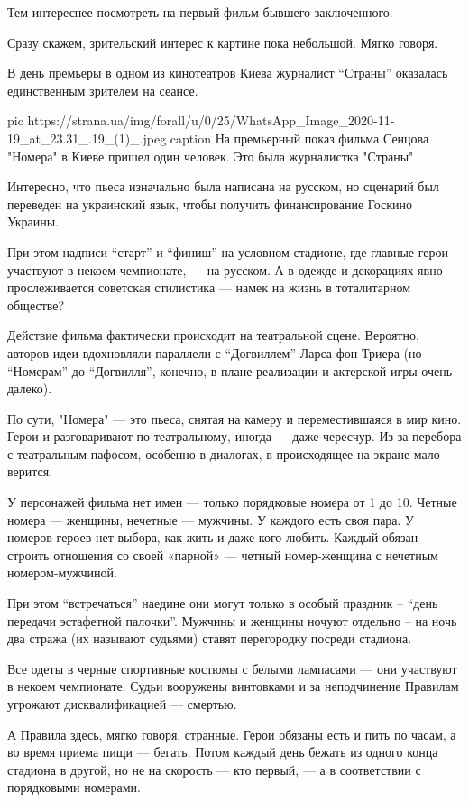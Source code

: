Тем интереснее посмотреть на первый фильм бывшего заключенного.

Сразу скажем, зрительский интерес к картине пока небольшой. Мягко говоря.

В день премьеры в одном из кинотеатров Киева журналист \enquote{Страны} оказалась
единственным зрителем на сеансе.

\ifcmt
pic https://strana.ua/img/forall/u/0/25/WhatsApp_Image_2020-11-19_at_23.31_.19_(1)_.jpeg
caption На премьерный показ фильма Сенцова "Номера" в Киеве пришел один человек. Это была журналистка "Страны"
\fi

Интересно, что пьеса изначально была написана на русском, но сценарий был
переведен на украинский язык, чтобы получить финансирование Госкино
Украины.

При этом надписи \enquote{старт} и \enquote{финиш} на условном стадионе, где главные герои
участвуют в некоем чемпионате, --- на русском. А в одежде и декорациях явно
прослеживается советская стилистика --- намек на жизнь в тоталитарном
обществе?

Действие фильма фактически происходит на театральной сцене. Вероятно,
авторов идеи вдохновляли параллели с \enquote{Догвиллем} Ларса фон Триера (но
\enquote{Номерам} до \enquote{Догвилля}, конечно, в плане реализации и актерской игры
очень далеко).

По сути, "Номера" --- это пьеса, снятая на камеру и переместившаяся в мир
кино. Герои и разговаривают по-театральному, иногда --- даже чересчур. Из-за
перебора с театральным пафосом, особенно в диалогах, в происходящее на
экране мало верится.

У персонажей фильма нет имен --- только порядковые номера от 1 до 10. Четные
номера --- женщины, нечетные --- мужчины. У каждого есть своя пара. У
номеров-героев нет выбора, как жить и даже кого любить. Каждый обязан
строить отношения со своей «парной» --- четный номер-женщина с нечетным
номером-мужчиной.

При этом \enquote{встречаться} наедине они могут только в особый праздник –
\enquote{день передачи эстафетной палочки}. Мужчины и женщины ночуют отдельно –
на ночь два стража (их называют судьями) ставят перегородку посреди стадиона.

Все одеты в черные спортивные костюмы с белыми лампасами --- они участвуют в
некоем чемпионате. Судьи вооружены винтовками и за неподчинение Правилам
угрожают дисквалификацией --- смертью.

А Правила здесь, мягко говоря, странные. Герои обязаны есть и пить по
часам, а во время приема пищи --- бегать. Потом каждый день бежать из одного
конца стадиона в другой, но не на скорость --- кто первый, --- а в
соответствии с порядковыми номерами.

